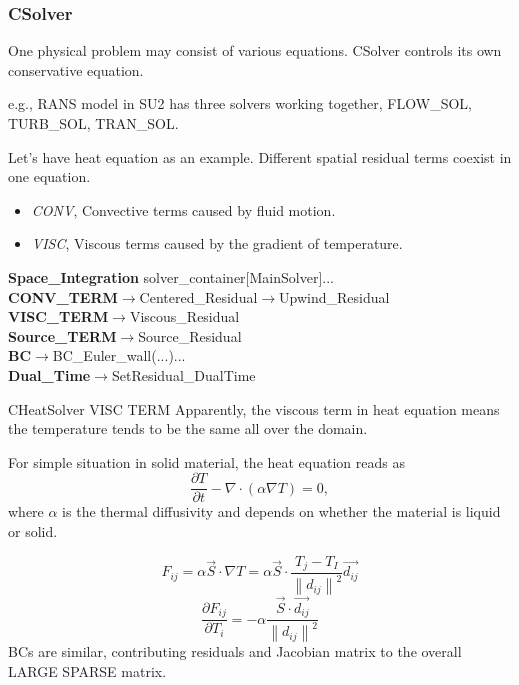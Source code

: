 \begin{frame}
\frametitle{CSolver}
One physical problem may consist of various equations.
CSolver controls its own conservative equation. 

e.g., RANS model in SU2 has three solvers working together, FLOW\_SOL, TURB\_SOL, TRAN\_SOL.



Let's have heat equation as an example.
Different spatial residual terms coexist in one equation.
\begin{itemize}
    \item \emph{CONV}, Convective terms caused by fluid motion.
    \item \emph{VISC}, Viscous terms caused by the gradient of temperature. 
\end{itemize}

\textbf{Space\_Integration}
solver\_container[MainSolver]...\\
\textbf{CONV\_TERM}$\longrightarrow$Centered\_Residual\quad$\longrightarrow$Upwind\_Residual\\
\textbf{VISC\_TERM}$\longrightarrow$Viscous\_Residual\\
\textbf{Source\_TERM}$\longrightarrow$Source\_Residual\\
\textbf{BC}$\longrightarrow$BC\_Euler\_wall(...)...\\
\textbf{Dual\_Time}$\longrightarrow$SetResidual\_DualTime

\end{frame}


\begin{frame}{CHeatSolver VISC TERM}
Apparently, the viscous term in heat equation means the temperature tends to be the same all over the domain.

For simple situation in solid material, the heat equation reads as
\begin{equation}
    \frac{\partial T}{\partial t} - \nabla\cdot(\alpha \nabla T) =0,
\end{equation}
where $\alpha$ is the thermal diffusivity and depends on whether the material is liquid or solid.

\begin{equation}
F_{ij}=\alpha \vec{S}\cdot \nabla T=\alpha \vec{S}\cdot \frac{T_j-T_I}{\left \| d_{ij} \right \|^2}\vec{d_{ij}}
\end{equation}
\begin{equation}
    \frac{\partial F_{ij}}{\partial T_i}=-\alpha \frac{\vec{S}\cdot \vec{d_{ij}}}{\left \| d_{ij} \right \|^2}
\end{equation}
BCs are similar, contributing residuals and Jacobian matrix to the overall LARGE SPARSE matrix.
\end{frame}


